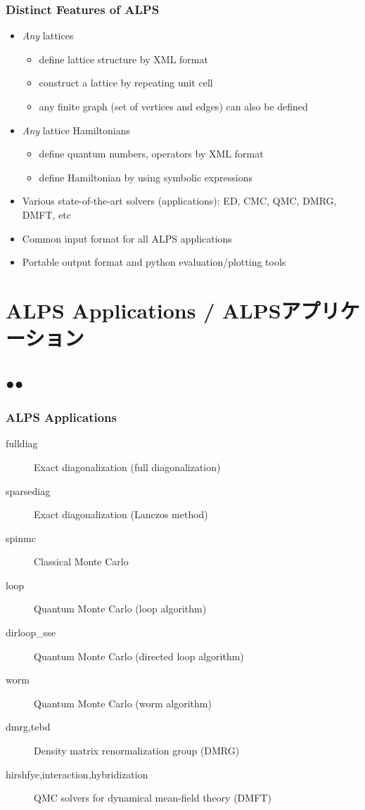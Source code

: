 \begin{frame}
  \frametitle{Distinct Features of ALPS}
  \begin{itemize}
  \item {\em Any} lattices
    \begin{itemize}
    \item define lattice structure by XML format
    \item construct a lattice by repeating unit cell
    \item any finite graph (set of vertices and edges) can also be defined
    \end{itemize}
  \item {\em Any} lattice Hamiltonians
    \begin{itemize}
    \item define quantum numbers, operators by XML format
    \item define Hamiltonian by using symbolic expressions
    \end{itemize}
  \item Various state-of-the-art solvers (applications): ED, CMC, QMC, DMRG, DMFT, etc
  \item Common input format for all ALPS applications
  \item Portable output format and python evaluation/plotting tools
  \end{itemize}
\end{frame}

\section{ALPS Applications / ALPSアプリケーション}
\subsection*{{\protect\color{red}●}{\protect\color{blue}●}}

\begin{frame}
  \frametitle{ALPS Applications}
  \begin{description}
  \item[fulldiag] Exact diagonalization (full diagonalization)
  \item[sparsediag] Exact diagonalization (Lanczos method)
  \item[spinmc] Classical Monte Carlo
  \item[loop] Quantum Monte Carlo (loop algorithm)
  \item[dirloop\_sse] Quantum Monte Carlo (directed loop algorithm)
  \item[worm] Quantum Monte Carlo (worm algorithm)
  \item[dmrg,tebd] Density matrix renormalization group (DMRG)
  \item[hirshfye,interaction,hybridization] QMC solvers for dynamical mean-field theory (DMFT)
  \end{description}
\end{frame}

